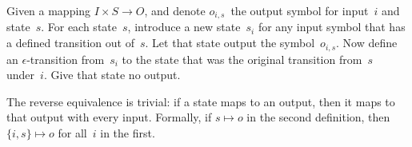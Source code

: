 Given a mapping $I\times S\rightarrow O$, and denote
$o_{i,s}$~the output symbol for input~$i$ and state~$s$.
For each state~$s$,
introduce a new state~$s_i$ for any input symbol that has a defined
transition out of~$s$. Let that state output the
symbol~$o_{i,s}$. Now define an $\epsilon$-transition
from~$s_i$ to the state that was the original transition from~$s$
under~$i$. Give that state no output.

The reverse equivalence is trivial: if a state maps to an output, then
it maps to that output with every input. Formally, if
$s\mapsto o$ in the second definition, then
$\{i,s\}\mapsto o$ for all~$i$ in the first.
